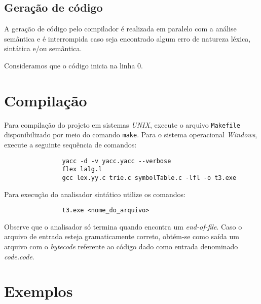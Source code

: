 \documentclass{article}
\begin{document}

	\subsection{Geração de código} %
	\label{sub:geracao_de_codigo}
		A geração de código pelo compilador é realizada em paralelo com a análise semântica e é interrompida caso seja encontrado algum erro de natureza léxica, sintática e/ou semântica.

		Consideramos que o código inicia na linha 0.



\section{Compilação} %
\label{sec:compilacao}
	Para compilação do projeto em sistemas \emph{UNIX}, execute o arquivo \verb=Makefile= disponibilizado por meio do comando \verb=make=. Para o sistema operacional \emph{Windows}, execute a seguinte sequência de comandos:

	\begin{center}
		\begin{minipage}[ht]{0.5\textwidth}
			\begin{verbatim}
				yacc -d -v yacc.yacc --verbose 
				flex lalg.l
				gcc lex.yy.c trie.c symbolTable.c -lfl -o t3.exe
			\end{verbatim}
		\end{minipage}
	\end{center}

	Para execução do analisador sintático utilize os comandos:

	\begin{center}
		\begin{minipage}[ht]{0.5\textwidth}
			\begin{verbatim}
				t3.exe <nome_do_arquivo>
			\end{verbatim}
		\end{minipage}
	\end{center}

	Observe que o analisador só termina quando encontra um \emph{end-of-file}. Caso o arquivo de entrada esteja gramaticamente correto, obtém-se como saída um arquivo com o \emph{bytecode} referente ao código dado como entrada denominado \emph{code.code}.

\section{Exemplos} %
\label{sec:exemplos}

\end{document}
